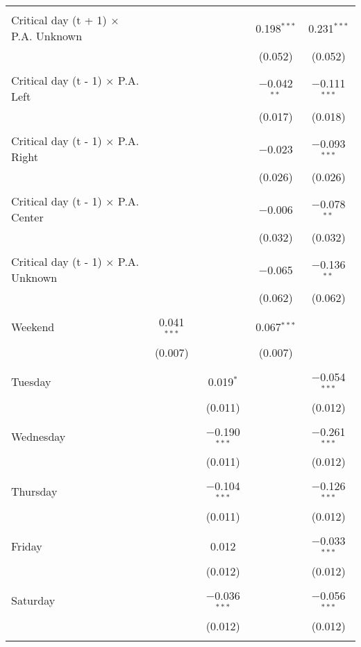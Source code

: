 \documentclass[
]{article}
\begin{document}
\begin{table}[!htbp]
{\begin{tabular}{@{\extracolsep{5pt}}lcccc}
  & & & & \\ 
 Critical day (t + 1) $\times$ P.A. Unknown &  &  & 0.198$^{***}$ & 0.231$^{***}$ \\ 
  &  &  & (0.052) & (0.052) \\ 
  & & & & \\ 
 Critical day (t - 1) $\times$ P.A. Left &  &  & $-$0.042$^{**}$ & $-$0.111$^{***}$ \\ 
  &  &  & (0.017) & (0.018) \\ 
  & & & & \\ 
 Critical day (t - 1) $\times$ P.A. Right &  &  & $-$0.023 & $-$0.093$^{***}$ \\ 
  &  &  & (0.026) & (0.026) \\ 
  & & & & \\ 
 Critical day (t - 1) $\times$ P.A. Center &  &  & $-$0.006 & $-$0.078$^{**}$ \\ 
  &  &  & (0.032) & (0.032) \\ 
  & & & & \\ 
 Critical day (t - 1) $\times$ P.A. Unknown &  &  & $-$0.065 & $-$0.136$^{**}$ \\ 
  &  &  & (0.062) & (0.062) \\ 
  & & & & \\ 
 Weekend & 0.041$^{***}$ &  & 0.067$^{***}$ &  \\ 
  & (0.007) &  & (0.007) &  \\ 
  & & & & \\ 
 Tuesday &  & 0.019$^{*}$ &  & $-$0.054$^{***}$ \\ 
  &  & (0.011) &  & (0.012) \\ 
  & & & & \\ 
 Wednesday &  & $-$0.190$^{***}$ &  & $-$0.261$^{***}$ \\ 
  &  & (0.011) &  & (0.012) \\ 
  & & & & \\ 
 Thursday &  & $-$0.104$^{***}$ &  & $-$0.126$^{***}$ \\ 
  &  & (0.011) &  & (0.012) \\ 
  & & & & \\ 
 Friday &  & 0.012 &  & $-$0.033$^{***}$ \\ 
  &  & (0.012) &  & (0.012) \\ 
  & & & & \\ 
 Saturday &  & $-$0.036$^{***}$ &  & $-$0.056$^{***}$ \\ 
  &  & (0.012) &  & (0.012) \\ 
  & & & & \\ 

\end{tabular}}
\end{table}
\end{document}
